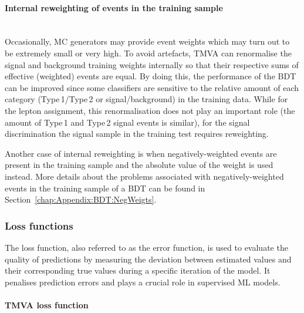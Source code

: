 \paragraph{Internal reweighting of events in the training sample}\mbox{}\\
Occasionally, MC generators may provide event weights which may turn out to be extremely small or very high. To avoid
artefacts, TMVA can renormalise the signal and background training weights internally so that their respective sums of 
effective (weighted) events are equal. By doing this, the performance of the BDT can be improved since some 
classifiers are sensitive to the relative amount of each category (Type$\,$1/Type$\,$2 or signal/background) in the training data.
While for the lepton assignment, this renormalisation does not play an important role (the amount of Type$\,$1 and Type$\,$2 
signal events is similar), for the \tHq signal discrimination the signal sample in the training test requires reweighting.

Another case of internal reweighting is when negatively-weighted events are present in the training sample and 
the absolute value of the weight is used instead. More details about the problems associated with negatively-weighted
events in the training sample of a BDT can be found in Section~\ref{chap:Appendix:BDT:NegWeigts}.

\subsubsection{Loss functions}
The loss function, also referred to as the error function, is used to evaluate 
the quality of predictions by measuring the deviation between estimated values and 
their corresponding true values during a specific iteration of the model. It penalises 
prediction errors and plays a crucial role in supervised ML models.



\paragraph{TMVA loss function}\mbox{}\\ 

